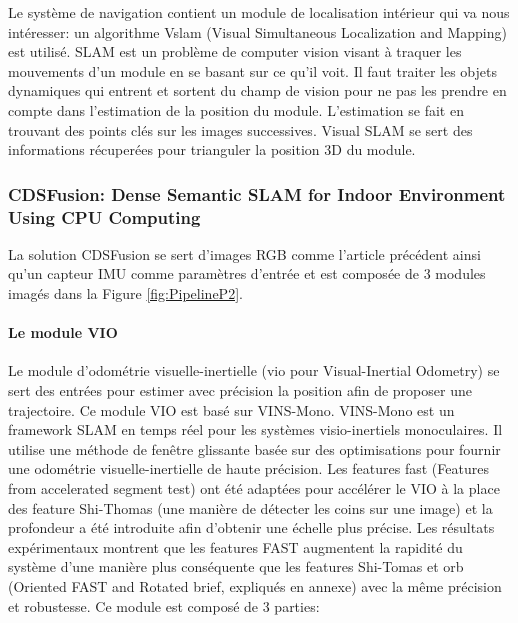 \documentclass[11pt]{article}
\begin{document}
          Le système de navigation contient un module de localisation intérieur qui va nous intéresser: un algorithme V\acrshort{slam} (Visual Simultaneous 
          Localization and Mapping) est utilisé. SLAM est un problème de computer vision visant à traquer les mouvements d'un module en se basant
          sur ce qu'il voit. Il faut traiter les objets dynamiques qui entrent et sortent du champ de vision pour ne pas les prendre en compte
          dans l'estimation de la position du module. L'estimation se fait en trouvant des points clés sur les images successives.  Visual SLAM
          se sert des informations récuperées pour trianguler la position 3D du module. 
    
        \pagebreak

        \subsubsection{CDSFusion: Dense Semantic SLAM for Indoor Environment Using CPU Computing}
          La solution CDSFusion \cite{wangCDSFusionDenseSemantic2022} se sert d'images RGB comme l'article précédent ainsi qu'un capteur IMU comme paramètres d'entrée et est composée de 
          3 modules imagés dans la Figure \ref{fig:PipelineP2}.

          \paragraph{Le module VIO}
            Le module d'odométrie visuelle-inertielle (\acrshort{vio} pour Visual-Inertial Odometry) se sert des entrées pour estimer avec précision la position 
            afin de proposer une trajectoire. Ce module VIO est basé sur VINS-Mono. VINS-Mono est un framework SLAM en temps réel pour les 
            systèmes visio-inertiels monoculaires. Il utilise une méthode de fenêtre glissante basée sur des optimisations pour fournir une odométrie 
            visuelle-inertielle de haute précision.
            Les features \acrshort{fast} (Features from accelerated segment test) ont été adaptées pour accélérer le VIO à 
            la place des feature Shi-Thomas (une manière de détecter les coins sur une image) et la profondeur a été introduite afin d'obtenir une échelle 
            plus précise. Les résultats expérimentaux montrent que les features FAST augmentent la rapidité du système d'une manière plus conséquente 
            que les features Shi-Tomas et \acrshort{orb} (Oriented FAST and Rotated \acrshort{brief}, expliqués en annexe) avec la même précision 
            et robustesse. Ce module est composé de 3 parties:
\end{document}
